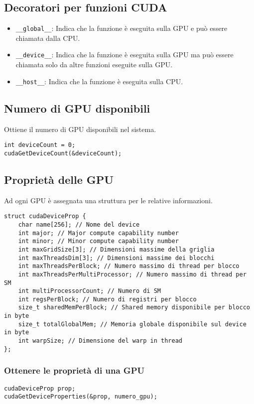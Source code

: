 \documentclass[a4paper,12pt]{article}
\begin{document}
\subsection{Decoratori per funzioni CUDA}
\begin{itemize}
    \item \texttt{\_\_global\_\_}: Indica che la funzione è eseguita sulla GPU e può essere chiamata dalla CPU.
    \item \texttt{\_\_device\_\_}: Indica che la funzione è eseguita sulla GPU ma può essere chiamata solo da altre funzioni eseguite sulla GPU.
    \item \texttt{\_\_host\_\_}: Indica che la funzione è eseguita sulla CPU.
\end{itemize}

\subsection{Numero di GPU disponibili}
Ottiene il numero di GPU disponibili nel sistema.
\begin{verbatim}
int deviceCount = 0;
cudaGetDeviceCount(&deviceCount);
\end{verbatim}

\subsection{Proprietà delle GPU}
Ad ogni GPU è assegnata una struttura per le relative informazioni.
\begin{lstlisting}
struct cudaDeviceProp {
    char name[256]; // Nome del device
    int major; // Major compute capability number
    int minor; // Minor compute capability number
    int maxGridSize[3]; // Dimensioni massime della griglia
    int maxThreadsDim[3]; // Dimensioni massime dei blocchi
    int maxThreadsPerBlock; // Numero massimo di thread per blocco
    int maxThreadsPerMultiProcessor; // Numero massimo di thread per SM
    int multiProcessorCount; // Numero di SM
    int regsPerBlock; // Numero di registri per blocco
    size_t sharedMemPerBlock; // Shared memory disponibile per blocco in byte
    size_t totalGlobalMem; // Memoria globale disponibile sul device in byte
    int warpSize; // Dimensione del warp in thread
};
\end{lstlisting}

\subsubsection{Ottenere le proprietà di una GPU}
\begin{verbatim}
cudaDeviceProp prop;
cudaGetDeviceProperties(&prop, numero_gpu);
\end{verbatim}
\end{document}
